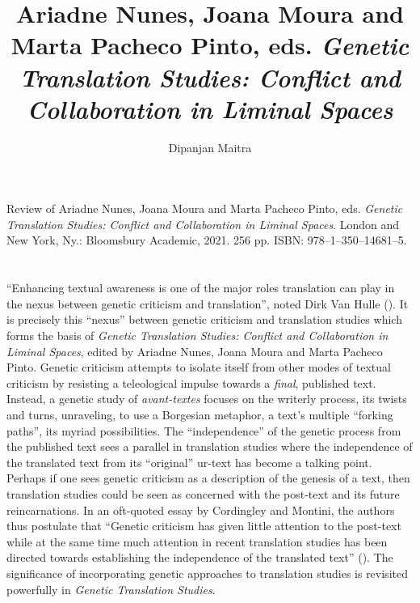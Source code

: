 \documentclass{article}
\author{Dipanjan Maitra}
\title{Ariadne Nunes, Joana Moura and Marta Pacheco Pinto, eds. \emph{Genetic Translation Studies: Conflict and Collaboration in Liminal Spaces}}
\begin{document}
\maketitle

Review of Ariadne Nunes, Joana Moura and Marta Pacheco Pinto, eds. \emph{Genetic Translation Studies: Conflict and Collaboration in Liminal Spaces}. London and New York, Ny.: Bloomsbury Academic, 2021. 256 pp. ISBN: 978–1–350–14681–5.


\section*{} 
``Enhancing textual awareness is one of the major roles translation can
play in the nexus between genetic criticism and translation'', noted
Dirk Van Hulle (\citeyear[43]{van_hulle_translation_2015}). It is precisely this ``nexus'' between
genetic criticism and translation studies which forms the basis of
\emph{Genetic Translation Studies: Conflict and Collaboration in Liminal
Spaces}, edited by Ariadne Nunes, Joana Moura and Marta Pacheco Pinto.
Genetic criticism attempts to isolate itself from other modes of textual
criticism by resisting a teleological impulse towards a \emph{final},
published text. Instead, a genetic study of \emph{avant-textes} focuses
on the writerly process, its twists and turns, unraveling, to use a
Borgesian metaphor, a text's multiple ``forking paths'', its myriad
possibilities. The ``independence'' of the genetic process from the
published text sees a parallel in translation studies where the
independence of the translated text from its ``original'' ur-text has
become a talking point. Perhaps if one sees genetic criticism as a
description of the genesis of a text, then translation studies could be
seen as concerned with the post-text and its future reincarnations. In
an oft-quoted essay by Cordingley and Montini, the authors thus
postulate that ``Genetic criticism has given little attention to the
post-text while at the same time much attention in recent translation
studies has been directed towards establishing the independence of the
translated text'' (\citeyear[5]{cordingley_genetic_2015}). The significance of incorporating genetic
approaches to translation studies is revisited powerfully in
\emph{Genetic Translation Studies}.
\end{document}
